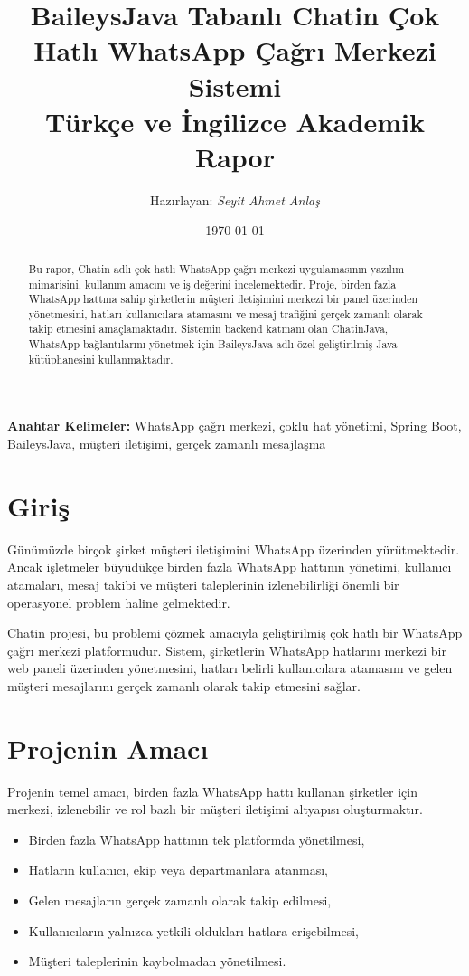 \documentclass[12pt,a4paper]{article}
\title{\textbf{BaileysJava Tabanlı Chatin Çok Hatlı WhatsApp Çağrı Merkezi Sistemi}\\
\large Türkçe ve İngilizce Akademik Rapor}
\author{Hazırlayan: \textit{Seyit Ahmet Anlaş}}
\date{\today}
\begin{document}
\maketitle


\begin{abstract}
Bu rapor, Chatin adlı çok hatlı WhatsApp çağrı merkezi uygulamasının yazılım mimarisini, kullanım amacını ve iş değerini incelemektedir. Proje, birden fazla WhatsApp hattına sahip şirketlerin müşteri iletişimini merkezi bir panel üzerinden yönetmesini, hatları kullanıcılara atamasını ve mesaj trafiğini gerçek zamanlı olarak takip etmesini amaçlamaktadır. Sistemin backend katmanı olan ChatinJava, WhatsApp bağlantılarını yönetmek için BaileysJava adlı özel geliştirilmiş Java kütüphanesini kullanmaktadır.
\end{abstract}

\textbf{Anahtar Kelimeler:} WhatsApp çağrı merkezi, çoklu hat yönetimi, Spring Boot, BaileysJava, müşteri iletişimi, gerçek zamanlı mesajlaşma

\section{Giriş}

Günümüzde birçok şirket müşteri iletişimini WhatsApp üzerinden yürütmektedir. Ancak işletmeler büyüdükçe birden fazla WhatsApp hattının yönetimi, kullanıcı atamaları, mesaj takibi ve müşteri taleplerinin izlenebilirliği önemli bir operasyonel problem haline gelmektedir.

Chatin projesi, bu problemi çözmek amacıyla geliştirilmiş çok hatlı bir WhatsApp çağrı merkezi platformudur. Sistem, şirketlerin WhatsApp hatlarını merkezi bir web paneli üzerinden yönetmesini, hatları belirli kullanıcılara atamasını ve gelen müşteri mesajlarını gerçek zamanlı olarak takip etmesini sağlar.

\section{Projenin Amacı}

Projenin temel amacı, birden fazla WhatsApp hattı kullanan şirketler için merkezi, izlenebilir ve rol bazlı bir müşteri iletişimi altyapısı oluşturmaktır.

\begin{itemize}
    \item Birden fazla WhatsApp hattının tek platformda yönetilmesi,
    \item Hatların kullanıcı, ekip veya departmanlara atanması,
    \item Gelen mesajların gerçek zamanlı olarak takip edilmesi,
    \item Kullanıcıların yalnızca yetkili oldukları hatlara erişebilmesi,
    \item Müşteri taleplerinin kaybolmadan yönetilmesi.
\end{itemize}
\end{document}
